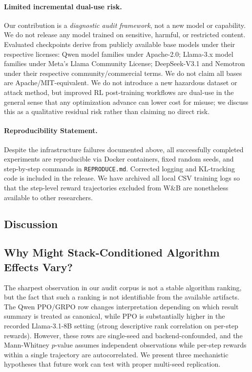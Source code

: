 \paragraph{Limited incremental dual-use risk.}
Our contribution is a \emph{diagnostic audit framework}, not a new model or capability. We do not release any model trained on sensitive, harmful, or restricted content. Evaluated checkpoints derive from publicly available base models under their respective licenses: Qwen model families under Apache-2.0; Llama-3.x model families under Meta's Llama Community License; DeepSeek-V3.1 and Nemotron under their respective community/commercial terms. We do not claim all bases are Apache/MIT-equivalent. We do not introduce a new hazardous dataset or attack method, but improved RL post-training workflows are dual-use in the general sense that any optimization advance can lower cost for misuse; we discuss this as a qualitative residual risk rather than claiming no direct risk.

\paragraph{Reproducibility Statement.}
Despite the infrastructure failures documented above, all successfully
completed experiments are reproducible via Docker containers, fixed random
seeds, and step-by-step commands in \texttt{REPRODUCE.md}. Corrected logging
and KL-tracking code is included in the release. We have archived all local
CSV training logs so that the step-level reward trajectories excluded from
W\&B are nonetheless available to other researchers.

\subsection{Discussion}
\label{sec:discussion}

\subsection{Why Might Stack-Conditioned Algorithm Effects Vary?}
\label{sec:discuss_model_algo}

The sharpest observation in our audit corpus is not a stable algorithm ranking,
but the fact that such a ranking is not identifiable from the available
artifacts.  The Qwen PPO/GRPO row changes interpretation depending on which
result summary is treated as canonical, while PPO is substantially higher in
the recorded Llama-3.1-8B setting (strong descriptive rank correlation on
per-step rewards).  However, these rows are single-seed and backend-confounded,
and the Mann-Whitney $p$-value assumes independent observations while per-step
rewards within a single trajectory are
autocorrelated.  We present three mechanistic hypotheses that future work
can test with proper multi-seed replication.

